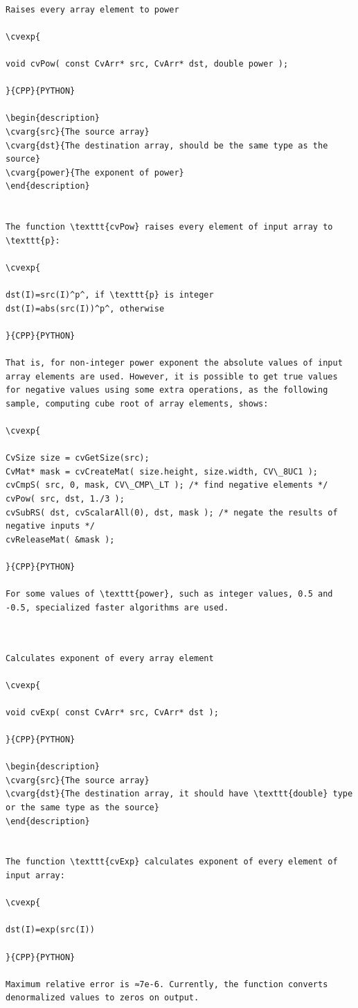 \begin{verbatim}

Raises every array element to power

\cvexp{

void cvPow( const CvArr* src, CvArr* dst, double power );

}{CPP}{PYTHON}

\begin{description}
\cvarg{src}{The source array}
\cvarg{dst}{The destination array, should be the same type as the source}
\cvarg{power}{The exponent of power}
\end{description}


The function \texttt{cvPow} raises every element of input array to \texttt{p}:

\cvexp{

dst(I)=src(I)^p^, if \texttt{p} is integer
dst(I)=abs(src(I))^p^, otherwise

}{CPP}{PYTHON}

That is, for non-integer power exponent the absolute values of input array elements are used. However, it is possible to get true values for negative values using some extra operations, as the following sample, computing cube root of array elements, shows:

\cvexp{

CvSize size = cvGetSize(src);
CvMat* mask = cvCreateMat( size.height, size.width, CV\_8UC1 );
cvCmpS( src, 0, mask, CV\_CMP\_LT ); /* find negative elements */
cvPow( src, dst, 1./3 );
cvSubRS( dst, cvScalarAll(0), dst, mask ); /* negate the results of negative inputs */
cvReleaseMat( &mask );

}{CPP}{PYTHON}

For some values of \texttt{power}, such as integer values, 0.5 and -0.5, specialized faster algorithms are used.


\end{verbatim}
\label{Exp}
\begin{verbatim}

Calculates exponent of every array element

\cvexp{

void cvExp( const CvArr* src, CvArr* dst );

}{CPP}{PYTHON}

\begin{description}
\cvarg{src}{The source array}
\cvarg{dst}{The destination array, it should have \texttt{double} type or the same type as the source}
\end{description}


The function \texttt{cvExp} calculates exponent of every element of input array:

\cvexp{

dst(I)=exp(src(I))

}{CPP}{PYTHON}

Maximum relative error is ≈7e-6. Currently, the function converts denormalized values to zeros on output.


\end{verbatim}
